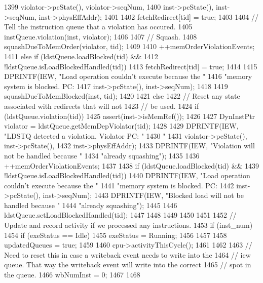 \begin{DoxyCode}
{{{{1399                         violator->pcState(), violator->seqNum,
1400                         inst->pcState(), inst->seqNum, inst->physEffAddr);
1401 
1402                 fetchRedirect[tid] = true;
1403 
1404                 // Tell the instruction queue that a violation has occured.
1405                 instQueue.violation(inst, violator);
1406 
1407                 // Squash.
1408                 squashDueToMemOrder(violator, tid);
1409 
1410                 ++memOrderViolationEvents;
1411             } else if (ldstQueue.loadBlocked(tid) &&
1412                        !ldstQueue.isLoadBlockedHandled(tid)) {
1413                 fetchRedirect[tid] = true;
1414 
1415                 DPRINTF(IEW, "Load operation couldn't execute because the "
1416                         "memory system is blocked.  PC: %
1417                         inst->pcState(), inst->seqNum);
1418 
1419                 squashDueToMemBlocked(inst, tid);
1420             }
1421         } else {
1422             // Reset any state associated with redirects that will not
1423             // be used.
1424             if (ldstQueue.violation(tid)) {
1425                 assert(inst->isMemRef());
1426 
1427                 DynInstPtr violator = ldstQueue.getMemDepViolator(tid);
1428 
1429                 DPRINTF(IEW, "LDSTQ detected a violation.  Violator PC: "
1430                         "%
1431                         violator->pcState(), inst->pcState(),
1432                         inst->physEffAddr);
1433                 DPRINTF(IEW, "Violation will not be handled because "
1434                         "already squashing\n");
1435 
1436                 ++memOrderViolationEvents;
1437             }
1438             if (ldstQueue.loadBlocked(tid) &&
1439                 !ldstQueue.isLoadBlockedHandled(tid)) {
1440                 DPRINTF(IEW, "Load operation couldn't execute because the "
1441                         "memory system is blocked.  PC: %
1442                         inst->pcState(), inst->seqNum);
1443                 DPRINTF(IEW, "Blocked load will not be handled because "
1444                         "already squashing\n");
1445 
1446                 ldstQueue.setLoadBlockedHandled(tid);
1447             }
1448 
1449         }
1450     }
1451 
1452     // Update and record activity if we processed any instructions.
1453     if (inst_num) {
1454         if (exeStatus == Idle) {
1455             exeStatus = Running;
1456         }
1457 
1458         updatedQueues = true;
1459 
1460         cpu->activityThisCycle();
1461     }
1462 
1463     // Need to reset this in case a writeback event needs to write into the
1464     // iew queue.  That way the writeback event will write into the correct
1465     // spot in the queue.
1466     wbNumInst = 0;
1467 
1468 }
\end{DoxyCode}
